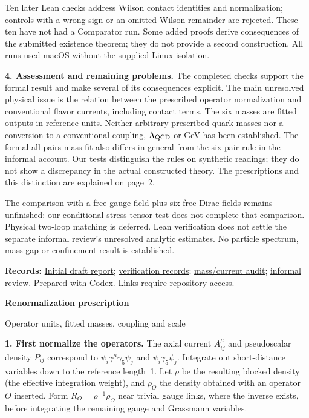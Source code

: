 \documentclass[11pt]{article}
\newcommand{\reviewdoc}[2]{\href{https://github.com/yang-mills-group/QCD/blob/main/#1}{#2}}
\begin{document}
Ten later Lean checks address Wilson contact identities and normalization;
controls with a wrong sign or an omitted Wilson remainder are rejected.
These ten have not had a Comparator run. Some added proofs derive
consequences of the submitted existence theorem; they do not provide a
second construction. All runs used macOS without the supplied Linux isolation.

\textbf{4. Assessment and remaining problems.}
The completed checks support the formal result and make several of its
consequences explicit. The main unresolved physical issue is the relation
between the prescribed operator normalization and conventional flavor
currents, including contact terms. The six masses are fitted outputs in
reference units. Neither arbitrary prescribed quark masses nor a conversion
to a conventional coupling, $\Lambda_{\rm QCD}$ or GeV has been established.
The formal all-pairs mass fit also differs in general from the six-pair rule
in the informal account. Our tests distinguish the rules on synthetic
readings; they do not show a discrepancy in the actual constructed theory.
The prescriptions and this distinction are explained on page~2.

The comparison with a free gauge field plus six free Dirac fields remains
unfinished: our conditional stress-tensor test does not complete that
comparison. Physical two-loop matching is deferred. Lean verification does
not settle the separate informal review's unresolved analytic estimates.
No particle spectrum, mass gap or confinement result is established.

{\small\textbf{Records:}
\reviewdoc{docs/qcd-verification-assessment.pdf}{Initial draft report};
\reviewdoc{docs/evidence.md}{verification records};
\reviewdoc{docs/mass-current-normalization.md}{mass/current audit};
\reviewdoc{docs/informal-part-VI-review-r02.pdf}{informal review}.
Prepared with Codex. Links require repository access.}

\newpage
\begin{center}
{\Large\bfseries Renormalization prescription}\par
\vspace{3pt}
Operator units, fitted masses, coupling and scale
\end{center}
\vspace{-4pt}

\textbf{1. First normalize the operators.}
The axial current $A^\mu_{ij}$ and pseudoscalar density $P_{ij}$ correspond to
$\bar\psi_i\gamma^\mu\gamma_5\psi_j$ and $\bar\psi_i\gamma_5\psi_j$.
Integrate out short-distance variables down to the reference length~1.
Let $\rho$ be the resulting blocked density (the effective integration
weight), and $\rho_O$ the density obtained with an operator $O$ inserted.
Form $R_O=\rho^{-1}\rho_O$ near trivial gauge links, where the inverse
exists, before integrating the remaining gauge and Grassmann variables.
\end{document}
